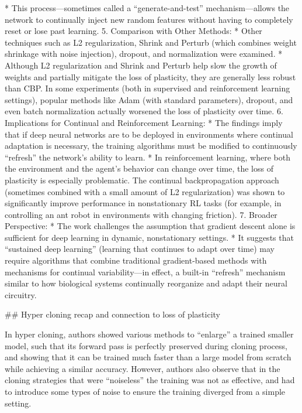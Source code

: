     * This process—sometimes called a “generate-and-test” mechanism—allows the network to continually inject new random features without having to completely reset or lose past learning.
5. Comparison with Other Methods:
    * Other techniques such as L2 regularization, Shrink and Perturb (which combines weight shrinkage with noise injection), dropout, and normalization were examined.
    * Although L2 regularization and Shrink and Perturb help slow the growth of weights and partially mitigate the loss of plasticity, they are generally less robust than CBP. In some experiments (both in supervised and reinforcement learning settings), popular methods like Adam (with standard parameters), dropout, and even batch normalization actually worsened the loss of plasticity over time.
6. Implications for Continual and Reinforcement Learning:
    * The findings imply that if deep neural networks are to be deployed in environments where continual adaptation is necessary, the training algorithms must be modified to continuously “refresh” the network’s ability to learn.
    * In reinforcement learning, where both the environment and the agent’s behavior can change over time, the loss of plasticity is especially problematic. The continual backpropagation approach (sometimes combined with a small amount of L2 regularization) was shown to significantly improve performance in nonstationary RL tasks (for example, in controlling an ant robot in environments with changing friction).
7. Broader Perspective:
    * The work challenges the assumption that gradient descent alone is sufficient for deep learning in dynamic, nonstationary settings.
    * It suggests that “sustained deep learning” (learning that continues to adapt over time) may require algorithms that combine traditional gradient-based methods with mechanisms for continual variability—in effect, a built-in “refresh” mechanism similar to how biological systems continually reorganize and adapt their neural circuitry.


## Hyper cloning recap and connection to loss of plasticity 

 In hyper cloning, authors showed various methods to “enlarge” a trained smaller model, such that its forward pass is perfectly preserved during cloning process, and showing that it can be trained much faster than a large model from scratch while achieving a similar accuracy. However, authors also observe that in the cloning strategies that were “noiseless” the training was not as effective, and had to introduce some types of noise to ensure the training diverged from a simple setting. 

